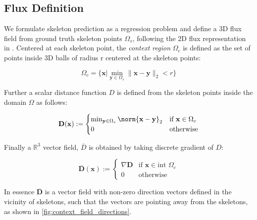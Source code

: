 \subsection{Flux Definition}
We formulate skeleton prediction as a regression problem and define a 3D flux field from ground truth skeleton points $\Omega_s$, following the 2D flux representation in \cite{Wang2019}. Centered at each skeleton point, the {\it context region} $\Omega_c$ is defined as the set of points inside 3D balls of radius r centered at the skeleton points:

\DeclarePairedDelimiter\norm\lVert\rVert

\begin{equation}
\Omega_c= \{ \mathbf{x} \vert \min_{\mathbf{y} \in \Omega_s} \|\mathbf{x} - \mathbf{y}\|_2 < r \}
\end{equation}

Further a scalar distance function $D$ is defined from the skeleton points inside the domain $\Omega$ as follows:

\begin{equation}
\mathbf{D}(\mathbf{x}) := \begin{cases}
		\min_{\mathbf{y} \in \Omega_s} \norm{\mathbf{x}-\mathbf{y}}_2 & \text{if } \mathbf{x} \in \Omega_c \\
		0  & \text{otherwise}
		\end{cases} 
\end{equation}

Finally a $\mathbb{R}^3$ vector field, $\overline{D}$ is obtained by taking discrete gradient of $D$:

\begin{equation}
 \overline{\mathbf{D}}(\mathbf{x}) := \begin{cases}
 \nabla \mathbf{D} & \text{if } \mathbf{x} \in \text{int } \Omega_c \\
 0  & \text{otherwise}
 \end{cases} 
\end{equation}
 
In essence $\overline{\mathbf{D}}$ is a vector field with non-zero direction vectors defined in the vicinity of skeletons, such that the vectors are pointing away from the skeletons, as shown in \autoref{fig:context_field_directions}.


